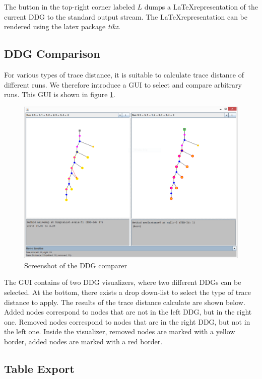 The button in the top-right corner labeled $L$ dumps a \LaTeX representation of the current DDG to the standard output stream. The \LaTeX representation can be rendered using the latex package \textit{tikz}. 

\subsection{DDG Comparison}

For various types of trace distance, it is suitable to calculate trace distance of different runs. We therefore introduce a GUI to select and compare arbitrary runs. This GUI is shown in figure \ref{fig:ddg_diff_ui}. 

\begin{figure}
\begin{center}
\includegraphics[scale=0.5]{screens/DiffView.png}
\end{center}
\caption{Screenshot of the DDG comparer}
\label{fig:ddg_diff_ui}
\end{figure}

The GUI contains of two DDG visualizers, where two different DDGs can be selected. At the bottom, there exists a drop down-list to select the type of trace distance to apply. The results of the trace distance calculate are shown below. Added nodes correspond to nodes that are not in the left DDG, but in the right one. Removed nodes correspond to nodes that are in the right DDG, but not in the left one. Inside the visualizer, removed nodes are marked with a yellow border, added nodes are marked with a red border.

\subsection{Table Export}


